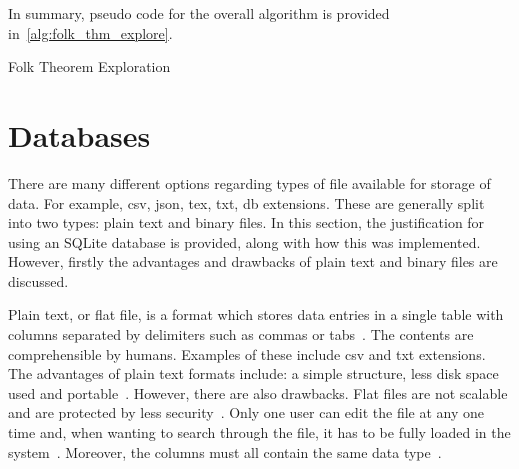 In summary, pseudo code for the overall algorithm is provided
in~\autoref{alg:folk_thm_explore}.

\IncMargin{2em}
\begin{algorithm}[H]
    \DontPrintSemicolon

    \caption{Folk Theorem Exploration}\label{alg:folk_thm_explore}
\end{algorithm}
\DecMargin{2em}



\section{Databases}\label{sec:Databases}
There are many different options regarding types of file available for storage of
data. For example, csv, json, tex, txt, db extensions. These are generally split into
two types: plain text and binary files. In this section, the justification for
using an SQLite database is provided, along with how this was implemented.
However, firstly the advantages and drawbacks of plain text and binary files are
discussed.

Plain text, or flat file, is a format which stores data entries in a single table
with columns separated by delimiters such as commas or tabs~\cite{Techopedia2011}.
The contents are comprehensible by humans. Examples of these
include csv and txt extensions. The advantages of plain text formats include: a simple
structure, less disk space used and portable~\cite{Techopedia2011}. However, there
are also drawbacks. Flat files are not scalable and
are protected by less security~\cite{Thomas2018}. Only one user can edit the file at any one time
and, when wanting to search through the file, it has to be fully loaded in the
system~\cite{Burke2017}. Moreover, the columns must all contain the same data type~\cite{Techopedia2011}.


